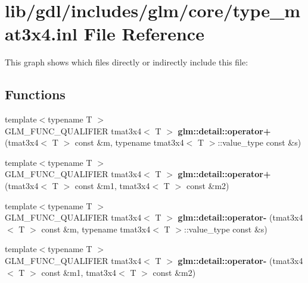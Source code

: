 \hypertarget{type__mat3x4_8inl}{}\section{lib/gdl/includes/glm/core/type\+\_\+mat3x4.inl File Reference}
\label{type__mat3x4_8inl}
This graph shows which files directly or indirectly include this file\+:
\subsection*{Functions}
\begin{DoxyCompactItemize}
\item 
\hypertarget{namespaceglm_1_1detail_ad21ec2679ffe6fd20a06c4a531a81a3f}{}{\footnotesize template$<$typename T $>$ }\\G\+L\+M\+\_\+\+F\+U\+N\+C\+\_\+\+Q\+U\+A\+L\+I\+F\+I\+E\+R tmat3x4$<$ T $>$ {\bfseries glm\+::detail\+::operator+} (tmat3x4$<$ T $>$ const \&m, typename tmat3x4$<$ T $>$\+::value\+\_\+type const \&s)\label{namespaceglm_1_1detail_ad21ec2679ffe6fd20a06c4a531a81a3f}

\item 
\hypertarget{namespaceglm_1_1detail_a3fe444d69a916029a82b3c88cff769d5}{}{\footnotesize template$<$typename T $>$ }\\G\+L\+M\+\_\+\+F\+U\+N\+C\+\_\+\+Q\+U\+A\+L\+I\+F\+I\+E\+R tmat3x4$<$ T $>$ {\bfseries glm\+::detail\+::operator+} (tmat3x4$<$ T $>$ const \&m1, tmat3x4$<$ T $>$ const \&m2)\label{namespaceglm_1_1detail_a3fe444d69a916029a82b3c88cff769d5}

\item 
\hypertarget{namespaceglm_1_1detail_a200fdfe1f727d2a5fc9c537386dc12dd}{}{\footnotesize template$<$typename T $>$ }\\G\+L\+M\+\_\+\+F\+U\+N\+C\+\_\+\+Q\+U\+A\+L\+I\+F\+I\+E\+R tmat3x4$<$ T $>$ {\bfseries glm\+::detail\+::operator-\/} (tmat3x4$<$ T $>$ const \&m, typename tmat3x4$<$ T $>$\+::value\+\_\+type const \&s)\label{namespaceglm_1_1detail_a200fdfe1f727d2a5fc9c537386dc12dd}

\item 
\hypertarget{namespaceglm_1_1detail_a014793033303e75d1a27de59a47dcb1d}{}{\footnotesize template$<$typename T $>$ }\\G\+L\+M\+\_\+\+F\+U\+N\+C\+\_\+\+Q\+U\+A\+L\+I\+F\+I\+E\+R tmat3x4$<$ T $>$ {\bfseries glm\+::detail\+::operator-\/} (tmat3x4$<$ T $>$ const \&m1, tmat3x4$<$ T $>$ const \&m2)\label{namespaceglm_1_1detail_a014793033303e75d1a27de59a47dcb1d}


\end{DoxyCompactItemize}
